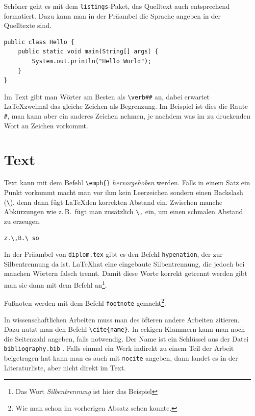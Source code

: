 Schöner geht es mit dem \verb|listings|-Paket, das Quelltext auch entsprechend formatiert. Dazu kann man in der Präambel die Sprache angeben in der Quelltexte sind.

\begin{lstlisting}
public class Hello {
    public static void main(String[] args) {
        System.out.println("Hello World");
    }
}
\end{lstlisting}

Im Text gibt man Wörter am Besten als \verb|\verb##| an, dabei erwartet \LaTeX zweimal das gleiche Zeichen als Begrenzung. Im Beispiel ist dies die Raute \verb|#|, man kann aber ein anderes Zeichen nehmen, je nachdem was im zu druckenden Wort an Zeichen vorkommt.



\section{Text}

Text kann mit dem Befehl \verb|\emph{}| \emph{hervorgehoben} werden. Falls in einem Satz ein Punkt vorkommt macht man vor ihm kein Leerzeichen sondern einen Backslash (\verb|\|), denn dann fügt \LaTeX den korrekten Abstand ein. Zwischen manche Abkürzungen wie z.\,B.\ fügt man zusätzlich \verb|\,| ein, um einen schmalen Abstand zu erzeugen.

\begin{verbatim}
z.\,B.\ so
\end{verbatim}

In der Präambel von \verb|diplom.tex| gibt es den Befehl \verb|hypenation|, der zur Silbentrennung da ist. \LaTeX hat eine eingebaute Silbentrennung, die jedoch bei manchen Wörtern falsch trennt. Damit diese Worte korrekt getrennt werden gibt man sie dann mit dem Befehl an\footnote{Das Wort \emph{Silbentrennung} ist hier das Beispiel}.

Fußnoten werden mit dem Befehl \verb|footnote| gemacht\footnote{Wie man schon im vorherigen Absatz sehen konnte.}.

In wissenschaftlichen Arbeiten muss man des öfteren andere Arbeiten zitieren. Dazu nutzt man den Befehl \verb|\cite{name}|. In eckigen Klammern kann man noch die Seitenzahl angeben, falls notwendig. Der Name ist ein Schlüssel aus der Datei \verb|bibliography.bib| \cite[S.\ 10]{kopka}. Falls einmal ein Werk indirekt zu einem Teil der Arbeit beigetragen hat kann man es auch mit \verb|nocite| angeben, dann landet es in der Literaturliste, aber nicht direkt im Text.



